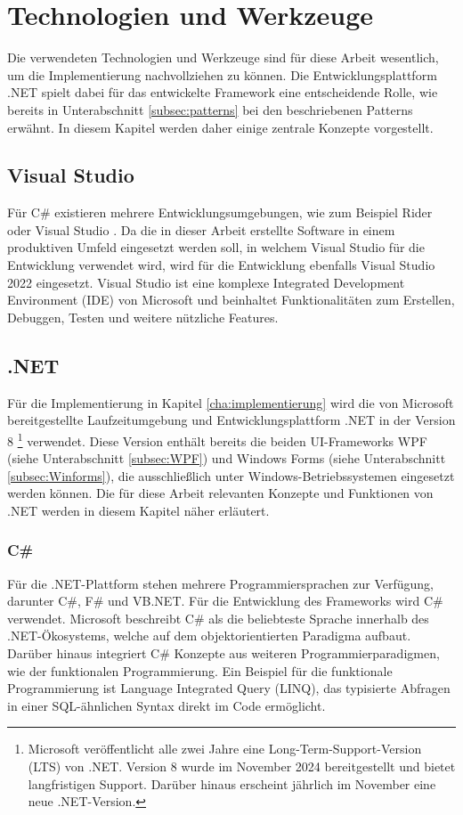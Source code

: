 \chapter{Technologien und Werkzeuge}
\label{cha:technologie_werkzeuge}
Die verwendeten Technologien und Werkzeuge sind für diese Arbeit wesentlich, um die Implementierung nachvollziehen zu können. Die Entwicklungsplattform .NET spielt dabei für das entwickelte Framework eine entscheidende Rolle, wie bereits in Unterabschnitt \ref{subsec:patterns} bei den beschriebenen Patterns erwähnt. In diesem Kapitel werden daher einige zentrale Konzepte vorgestellt.

\section{Visual Studio}
\label{sec:visual_studio}
Für C\# existieren mehrere Entwicklungsumgebungen, wie zum Beispiel Rider \cite{jetbrains-rider} oder Visual Studio \cite{MicrosoftVisualStudioIDE2022}. Da die in dieser Arbeit erstellte Software in einem produktiven Umfeld eingesetzt werden soll, in welchem Visual Studio für die Entwicklung verwendet wird, wird für die Entwicklung ebenfalls Visual Studio 2022 eingesetzt. Visual Studio ist eine komplexe Integrated Development Environment (IDE) von Microsoft und beinhaltet Funktionalitäten zum Erstellen, Debuggen, Testen und weitere nützliche Features.

\section{.NET}
\label{sec:dotnet}
Für die Implementierung in Kapitel \ref{cha:implementierung} wird die von Microsoft bereitgestellte Laufzeitumgebung und Entwicklungsplattform .NET \cite{dotnet} in der Version 8 \footnote{Microsoft veröffentlicht alle zwei Jahre eine Long-Term-Support-Version (LTS) von .NET. Version 8 wurde im November 2024 bereitgestellt und bietet langfristigen Support. Darüber hinaus erscheint jährlich im November eine neue .NET-Version.} verwendet. Diese Version enthält bereits die beiden UI-Frameworks WPF (siehe Unterabschnitt \ref{subsec:WPF}) und Windows Forms (siehe Unterabschnitt \ref{subsec:Winforms}), die ausschließlich unter Windows-Betriebssystemen eingesetzt werden können. Die für diese Arbeit relevanten Konzepte und Funktionen von .NET werden in diesem Kapitel näher erläutert.

\subsection{C\#}
\label{subsec:csharp}
Für die .NET-Plattform stehen mehrere Programmiersprachen zur Verfügung, darunter C\#, F\# und VB.NET. Für die Entwicklung des Frameworks wird C\# verwendet. Microsoft \cite{microsoft-tour-of-csharp} beschreibt C\# als die beliebteste Sprache innerhalb des .NET-Ökosystems, welche auf dem objektorientierten Paradigma aufbaut. Darüber hinaus integriert C\# Konzepte aus weiteren Programmierparadigmen, wie der funktionalen Programmierung. Ein Beispiel für die funktionale Programmierung ist Language Integrated Query (LINQ), das typisierte Abfragen in einer SQL-ähnlichen Syntax direkt im Code ermöglicht.

